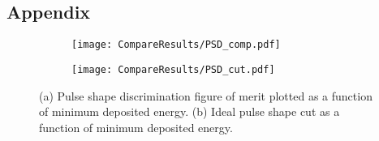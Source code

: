 \documentclass[main.tex]{subfiles}
\begin{document}
\begin{appendices}
\chapter{Appendix}\label{ch:appA}
\begin{figure}[ht]
	\begin{subfigure}[b]{\textwidth}
	    \centering
    	\texttt{[image: CompareResults/PSD\_comp.pdf]}
        \caption{}
	    \label{fig:psd_fom_trend} 
	\end{subfigure}
	\begin{subfigure}[b]{\textwidth}
    	\centering
        \texttt{[image: CompareResults/PSD\_cut.pdf]}
        \caption{}
    	\label{fig:psd_cut_trend} 
    \end{subfigure}
    \caption[Energy dependence of PSD figure of merit.]{(a) Pulse shape discrimination figure of merit plotted as a function of minimum deposited energy. (b) Ideal pulse shape cut as a function of minimum deposited energy.}
\end{figure}
\end{appendices}
\end{document}
